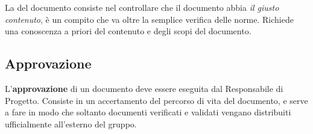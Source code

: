 La \textbf{} del documento consiste nel controllare che il documento abbia \textit{il giusto contenuto}, è un compito che va oltre la semplice verifica delle norme. Richiede una conoscenza a priori del contenuto e degli scopi del documento.

\subsection{Approvazione}

L'\textbf{approvazione} di un documento deve essere eseguita dal Responsabile di Progetto. Consiste in un accertamento del percorso di vita del documento, e serve a fare in modo che soltanto documenti verificati e validati vengano distribuiti ufficialmente all'esterno del gruppo.
